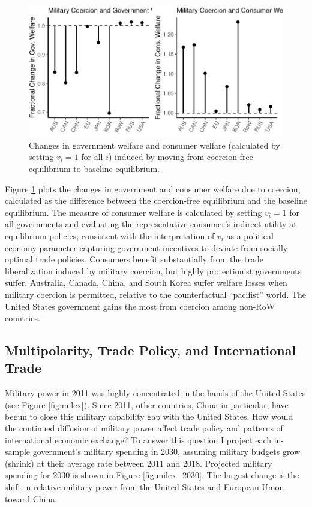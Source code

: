 \documentclass{puthesis}
\begin{document}
\begin{figure}
\centering
\includegraphics{figure/cfct1_welfare-1.pdf}
\caption{Changes in government welfare and consumer welfare (calculated
by setting \(v_i=1\) for all \(i\)) induced by moving from coercion-free
equilibrium to baseline equilibrium. \label{fig:cfct1_welfare}}
\end{figure}

Figure \ref{fig:cfct1_welfare} plots the changes in government and
consumer welfare due to coercion, calculated as the difference between
the coercion-free equilibrium and the baseline equilibrium. The measure
of consumer welfare is calculated by setting \(v_i=1\) for all
governments and evaluating the representative consumer's indirect
utility at equilibrium policies, consistent with the interpretation of
\(v_i\) as a political economy parameter capturing government incentives
to deviate from socially optimal trade policies. Consumers benefit
substantially from the trade liberalization induced by military
coercion, but highly protectionist governments suffer. Australia,
Canada, China, and South Korea suffer welfare losses when military
coercion is permitted, relative to the counterfactual ``pacifist''
world. The United States government gains the most from coercion among
non-RoW countries.

\subsection{Multipolarity, Trade Policy, and International Trade}

Military power in 2011 was highly concentrated in the hands of the
United States (see Figure \ref{fig:milex}). Since 2011, other countries,
China in particular, have begun to close this military capability gap
with the United States. How would the continued diffusion of military
power affect trade policy and patterns of international economic
exchange? To answer this question I project each in-sample government's
military spending in 2030, assuming military budgets grow (shrink) at
their average rate between 2011 and 2018. Projected military spending
for 2030 is shown in Figure \ref{fig:milex_2030}. The largest change is
the shift in relative military power from the United States and European
Union toward China.
\end{document}
